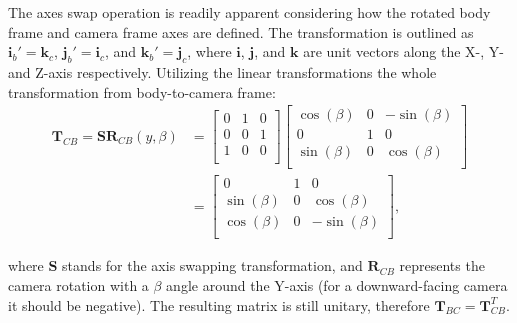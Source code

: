 The axes swap operation is readily apparent considering how the rotated body frame and camera frame axes are defined. The transformation is outlined as $\mathbf{i}_b'=\mathbf{k}_c$, $\mathbf{j}_b'=\mathbf{i}_c$, and $\mathbf{k}_b'=\mathbf{j}_c$, where $\mathbf{i}$, $\mathbf{j}$, and $\mathbf{k}$ are unit vectors along the X-, Y- and Z-axis respectively. Utilizing the linear transformations the whole transformation from body-to-camera frame:
\begin{equation}
\begin{aligned}
    \mathbf{T}_{CB}=\mathbf{S}\mathbf{R}_{CB}(y,\beta) &= \begin{bmatrix}
            0 & 1 & 0 \\
            0 & 0 & 1 \\
            1 & 0 & 0 \\
        \end{bmatrix}
        \begin{bmatrix}
            \cos(\beta) & 0 & -\sin(\beta) \\
            0 & 1 & 0 \\
            \sin(\beta) & 0 & \cos(\beta) \\
        \end{bmatrix} \\ &= \begin{bmatrix}
            0 & 1 & 0 \\
            \sin(\beta) & 0 & \cos(\beta) \\
            \cos(\beta) & 0 & -\sin(\beta) \\
        \end{bmatrix},
\end{aligned}
\end{equation}

where $\mathbf{S}$ stands for the axis swapping transformation, and $\mathbf{R}_{CB}$ represents the camera rotation with a $\beta$ angle around the Y-axis (for a downward-facing camera it should be negative). The resulting matrix is still unitary, therefore $\mathbf{T}_{BC}=\mathbf{T}_{CB}^T$.


